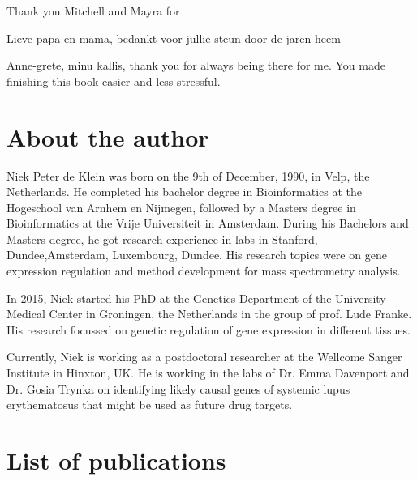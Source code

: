 \begin{appendices}
Thank you Mitchell and Mayra for 

Lieve papa en mama, bedankt voor jullie steun door de jaren heem

Anne-grete, minu kallis, thank you for always being there for me. You made finishing this book easier and less stressful. 

\chapter{About the author}

Niek Peter de Klein was born on the 9th of December, 1990, in Velp, the Netherlands. He completed his bachelor degree in Bioinformatics at the Hogeschool van Arnhem en Nijmegen, followed by a Masters degree in Bioinformatics at the Vrije Universiteit in Amsterdam. During his Bachelors and Masters degree, he got research experience in labs in Stanford, Dundee,Amsterdam, Luxembourg, Dundee. His research topics were on gene expression regulation and method development for mass spectrometry analysis.  

In 2015, Niek started his PhD at the Genetics Department of the University Medical Center in Groningen, the Netherlands in the group of prof. Lude Franke. His research focussed on genetic regulation of gene expression in different tissues. 


Currently, Niek is working as a postdoctoral researcher at the Wellcome Sanger Institute in Hinxton, UK. He is working in the labs of Dr. Emma Davenport and Dr. Gosia Trynka on identifying likely causal genes of systemic lupus erythematosus that might be used as future drug targets.

\chapter{List of publications}





\end{appendices}

